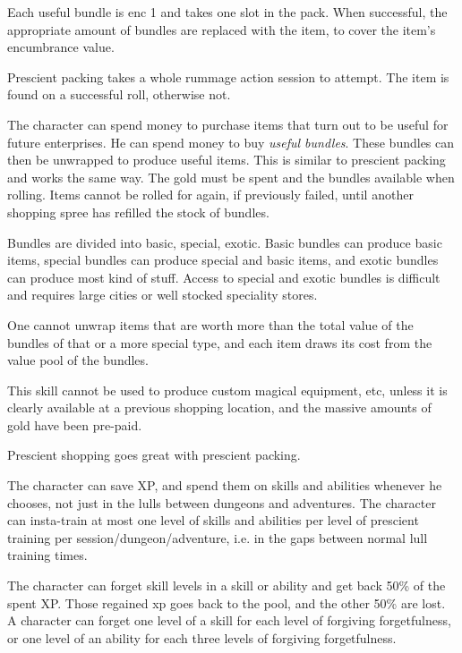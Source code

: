 Each useful bundle is enc 1 and takes one slot in the pack. When successful, the appropriate amount of bundles are replaced with the item, to cover the item's encumbrance value.

Prescient packing takes a whole rummage action session to attempt. The item is found on a successful roll, otherwise not.


 The character can spend money to purchase items that turn out to be useful for future enterprises. He can spend money to buy \emph{useful bundles}. These bundles can then be unwrapped to produce useful items. This is similar to prescient packing and works the same way.
The gold must be spent and the bundles available when rolling. Items cannot be rolled for again, if previously failed, until another shopping spree has refilled the stock of bundles.

Bundles are divided into basic, special, exotic. Basic bundles can produce basic items, special bundles can produce special and basic items, and exotic bundles can produce most kind of stuff. Access to special and exotic bundles is difficult and requires large cities or well stocked speciality stores.

One cannot unwrap items that are worth more than the total value of the bundles of that or a more special type, and each item draws its cost from the value pool of the bundles.

This skill cannot be used to produce custom magical equipment, etc, unless it is clearly available at a previous shopping location, and the massive amounts of gold have been pre-paid.

Prescient shopping goes great with prescient packing.


 The character can save XP, and spend them on skills and abilities whenever he chooses, not just in the lulls between dungeons and adventures. The character can insta-train at most one level of skills and abilities per level of prescient training per session/dungeon/adventure, i.e. in the gaps between normal lull training times.


 The character can forget skill levels in a skill or ability and get back 50\% of the spent XP. Those regained xp goes back to the pool, and the other 50\% are lost.
A character can forget one level of a skill for each level of forgiving forgetfulness, or one level of an ability for each three levels of forgiving forgetfulness.

